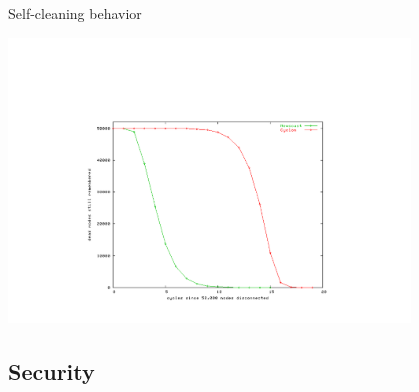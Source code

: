 \begin{frame}{Self-cleaning behavior}
	
\begin{center}
\includegraphics[width=0.8\textwidth]{figs/11/clean}	
\end{center}
	
\end{frame}

\subsection{Security}


